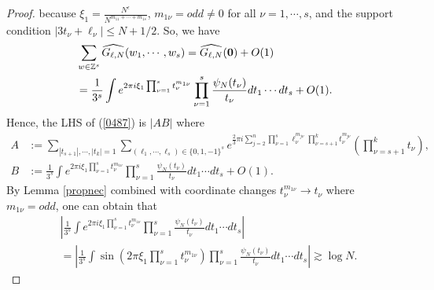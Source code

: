 \documentclass[11 pt,letterpaper]{amsart}
\theoremstyle{plain}
\theoremstyle{definition}
\theoremstyle{remark} \theoremstyle{exam} \theoremstyle{ob}
\numberwithin{equation}{section}
\begin{document}
\begin{proof}
because $\xi_1=\frac{N^{\epsilon}}{N^{m_{11}+\cdots+m_{1s}}}$, $m_{1\nu}=odd\ne 0$ for all $\nu=1,\cdots,s$, and the support condition $|3t_\nu+\ell_\nu|\le N+1/2$. So, we have
\begin{align*}
	&\sum_{w\in \mathbb{Z}^s} \widehat{G_{\ell,N}}(w_1,\cdots,w_s)=\widehat{G_{\ell,N}}({\bf 0})+O(1)\\
	&=\frac{1}{3^s}\int   e^{2\pi i \xi_1 \prod_{\nu=1}^s t_\nu^{m_{1\nu}} } \prod_{\nu=1}^s \frac{\psi_{N}(t_\nu)}{t_\nu}   dt_1\cdots dt_s+O(1).
\end{align*}
Hence,
the LHS of (\ref{0487}) is $|AB|$ where
\begin{align*}
A&:=\sum_{|t_{s+1}|,\cdots,|t_k|=1}  \sum_{(\ell_1,\cdots,\ell_s)\in\{0,1,-1\}^s} e^{\frac{2}{3}\pi i 
 \sum_{j=2}^n \prod_{\nu=1}^s \ell_\nu^{m_{j\nu}} \prod_{\nu=s+1}^k t_\nu^{m_{j\nu}}  }\left(\prod_{\nu=s+1}^k t_{\nu}\right),\\
B&:= \frac{1}{3^s}\int   e^{2\pi i \xi_1 \prod_{\nu=1}^s t_\nu^{m_{1\nu}} } \prod_{\nu=1}^s \frac{\psi_{N}(t_\nu)}{t_\nu}   dt_1\cdots dt_s+O(1).
\end{align*}
By Lemma \ref{propnec} combined  with coordinate changes $t_\nu^{m_{1\nu}}\rightarrow t_\nu$ where $m_{1\nu}=odd$, one can obtain that
\begin{align*}
  &\left|  \frac{1}{3^s}\int   e^{2\pi i \xi_1 \prod_{\nu=1}^s t_\nu^{m_{1\nu}} } \prod_{\nu=1}^s \frac{\psi_{N}(t_\nu)}{t_\nu}   dt_1\cdots dt_s\right| \\
 &=\left| \frac{1}{3^s}  \int   \sin \left(2\pi  \xi_1 \prod_{\nu=1}^s t_\nu^{m_{1\nu}}\right)   \prod_{\nu=1}^s \frac{\psi_{N}(t_\nu)}{t_\nu}   dt_1\cdots dt_s\right|\gtrsim  \log N.
\end{align*}


\end{proof}
\end{document}
